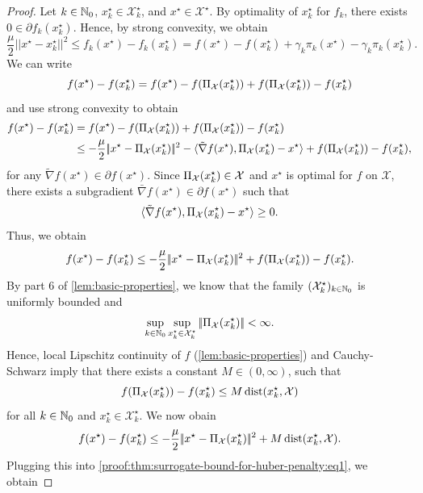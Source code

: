 \begin{proof}
    Let $k\in\mathbb{N}_0$, $x_k^\star\in\mathcal{X}_k^\star$, and $x^\star\in\mathcal{X}^\star$.
    By optimality of $x_k^\star$ for $f_k$, there exists
    $0 \in \partial f_k(x_k^\star)$. Hence, by
    strong convexity, we obtain
    \begin{equation}
        \label{proof:thm:surrogate-bound-for-huber-penalty:eq1}
        \frac{\mu}{2} |\!|x^\star - x_k^\star|\!|^2
        \leq f_k(x^\star) - f_k(x_k^\star)
        = f(x^\star) - f(x_k^\star) + \gamma_k\pi_k(x^\star) - \gamma_k\pi_k(x_k^\star).
    \end{equation}
    We can write
    \[
        f(x^\star) - f(x_k^\star) = f(x^\star) - f(\operatorname{\Pi_\mathcal{X}}(x_k^\star)) + f(\operatorname{\Pi_\mathcal{X}}(x_k^\star)) - f(x_k^\star)
    \]
    and use strong convexity to obtain
    \begin{align*}
        f(x^\star) - f(x_k^\star) &= f(x^\star) - f(\operatorname{\Pi_\mathcal{X}}(x_k^\star)) + f(\operatorname{\Pi_\mathcal{X}}(x_k^\star)) - f(x_k^\star) \\
                                  &\leq -\frac{\mu}{2} |\!|x^\star - \operatorname{\Pi_\mathcal{X}}(x_k^\star)|\!|^2
                                    - \langle \tilde{\nabla} f(x^\star), \operatorname{\Pi_\mathcal{X}}(x_k^\star) - x^\star \rangle + f(\operatorname{\Pi_\mathcal{X}}(x_k^\star)) - f(x_k^\star), 
    \end{align*}
    for any $\tilde{\nabla} f(x^\star) \in \partial f(x^\star)$.
    Since $\operatorname{\Pi_\mathcal{X}}(x_k^\star)\in\mathcal{X}$ and $x^\star$ is optimal for $f$ on $\mathcal{X}$,
    there exists a subgradient $\bar{\nabla} f(x^\star) \in \partial f(x^\star)$ such that
    \[
        \langle \tilde{\nabla} f(x^\star), \operatorname{\Pi_\mathcal{X}}(x_k^\star) - x^\star \rangle \geq 0.
    \]
    Thus, we obtain
    \[
        f(x^\star) - f(x_k^\star) \leq -\frac{\mu}{2} |\!|x^\star - \operatorname{\Pi_\mathcal{X}}(x_k^\star)|\!|^2 + f(\operatorname{\Pi_\mathcal{X}}(x_k^\star)) - f(x_k^\star).
    \]
    By part 6 of \cref{lem:basic-properties}, we know that the
    family $(\mathcal{X}_k^\star)_{k\in\mathbb{N}_0}$ is uniformly bounded and
    \[
        \sup_{k\in\mathbb{N}_0} \sup_{x_k^\star\in\mathcal{X}_k^\star} |\!|\Pi_\mathcal{X}(x_k^\star)|\!| < \infty.
    \]
    Hence, local Lipschitz continuity of $f$ (\cref{lem:basic-properties}) and Cauchy-Schwarz imply that
    there exists a constant $M\in (0,\infty)$, such that
    \[
        f(\operatorname{\Pi_\mathcal{X}}(x_k^\star)) - f(x_k^\star) \leq M \operatorname{dist}(x_k^\star, \mathcal{X})
    \]
    for all $k\in\mathbb{N}_0$ and $x_k^\star \in \mathcal{X}_k^\star$.
    We now obain
    \[
        f(x^\star) - f(x_k^\star) \leq -\frac{\mu}{2} |\!|x^\star - \operatorname{\Pi_\mathcal{X}}(x_k^\star)|\!|^2 + M \operatorname{dist}(x_k^\star, \mathcal{X}).
    \]
    Plugging this into \eqref{proof:thm:surrogate-bound-for-huber-penalty:eq1}, we obtain

\end{proof}
